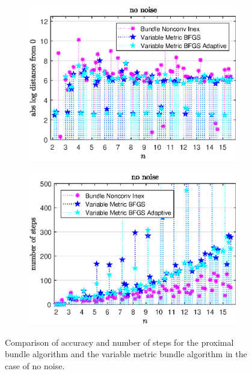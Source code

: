 \begin{figure}[ht]%
	\begin{subfigure}{0.49\textwidth}
		\includegraphics[width=\textwidth]{Pictures/Plots/no_noise.eps}%
	\end{subfigure}
	\begin{subfigure}{0.49\textwidth}
		\includegraphics[width=\textwidth]{Pictures/Plots/steps_no_noise.eps}%
	\end{subfigure}
	\caption[Accuracy and number of steps: no noise]{Comparison of accuracy and number of steps for the proximal bundle algorithm and the variable metric bundle algorithm in the case of no noise.}
	\label{fig_no_noise}
\end{figure}

